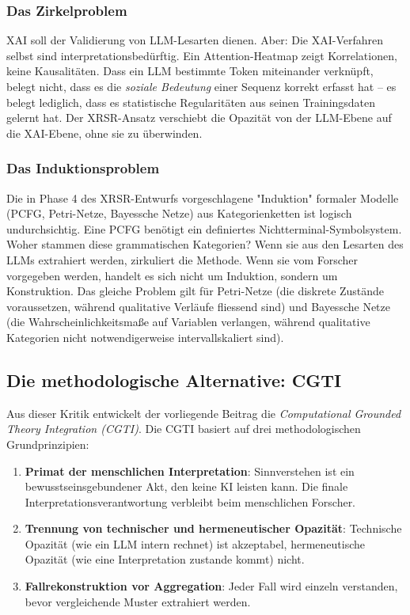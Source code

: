 \documentclass[12pt,a4paper]{article}
\begin{document}
\subsubsection{Das Zirkelproblem}

XAI soll der Validierung von LLM-Lesarten dienen. Aber: Die XAI-Verfahren selbst sind interpretationsbedürftig. Ein Attention-Heatmap zeigt Korrelationen, keine Kausalitäten. Dass ein LLM bestimmte Token miteinander verknüpft, belegt nicht, dass es die \textit{soziale Bedeutung} einer Sequenz korrekt erfasst hat – es belegt lediglich, dass es statistische Regularitäten aus seinen Trainingsdaten gelernt hat. Der XRSR-Ansatz verschiebt die Opazität von der LLM-Ebene auf die XAI-Ebene, ohne sie zu überwinden.

\subsubsection{Das Induktionsproblem}

Die in Phase 4 des XRSR-Entwurfs vorgeschlagene "Induktion" formaler Modelle (PCFG, Petri-Netze, Bayessche Netze) aus Kategorienketten ist logisch undurchsichtig. Eine PCFG benötigt ein definiertes Nichtterminal-Symbolsystem. Woher stammen diese grammatischen Kategorien? Wenn sie aus den Lesarten des LLMs extrahiert werden, zirkuliert die Methode. Wenn sie vom Forscher vorgegeben werden, handelt es sich nicht um Induktion, sondern um Konstruktion. Das gleiche Problem gilt für Petri-Netze (die diskrete Zustände voraussetzen, während qualitative Verläufe fliessend sind) und Bayessche Netze (die Wahrscheinlichkeitsmaße auf Variablen verlangen, während qualitative Kategorien nicht notwendigerweise intervallskaliert sind).

\subsection{Die methodologische Alternative: CGTI}

Aus dieser Kritik entwickelt der vorliegende Beitrag die \textit{Computational Grounded Theory Integration (CGTI)}. Die CGTI basiert auf drei methodologischen Grundprinzipien:

\begin{enumerate}
    \item \textbf{Primat der menschlichen Interpretation}: Sinnverstehen ist ein bewusstseinsgebundener Akt, den keine KI leisten kann. Die finale Interpretationsverantwortung verbleibt beim menschlichen Forscher.
    \item \textbf{Trennung von technischer und hermeneutischer Opazität}: Technische Opazität (wie ein LLM intern rechnet) ist akzeptabel, hermeneutische Opazität (wie eine Interpretation zustande kommt) nicht.
    \item \textbf{Fallrekonstruktion vor Aggregation}: Jeder Fall wird einzeln verstanden, bevor vergleichende Muster extrahiert werden.
\end{enumerate}
\end{document}
